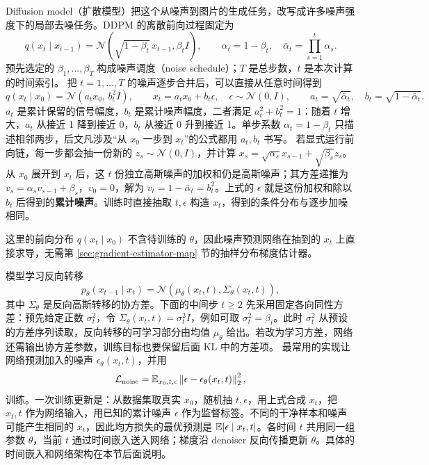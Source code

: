 Diffusion model（扩散模型）把这个从噪声到图片的生成任务，改写成许多噪声强度下的局部去噪任务。DDPM 的离散前向过程固定为~\cite{ho2020ddpm}
\begin{equation}
 q(x_t\mid x_{t-1})
 =\mathcal N\!\left(\sqrt{1-\beta_t}\,x_{t-1},\beta_t I\right),
\qquad \alpha_t=1-\beta_t,\quad
 \bar\alpha_t=\prod_{s=1}^{t}\alpha_s.
\end{equation}
预先选定的 \(\beta_1,\ldots,\beta_T\) 构成噪声调度（noise schedule）；\(T\) 是总步数，\(t\) 是本次计算的时间索引。
把 \(t=1,\ldots,T\) 的噪声逐步合并后，可以直接从任意时间得到
\begin{equation}
 q(x_t\mid x_0)
 =\mathcal N\!\left(a_tx_0,\,b_t^2I\right),
\qquad
 x_t=a_tx_0+b_t\epsilon,\quad
 \epsilon\sim\mathcal N(0,I),
\qquad
 a_t=\sqrt{\bar\alpha_t},\quad b_t=\sqrt{1-\bar\alpha_t}.
 \label{eq:ddpm-marginal}
\end{equation}
\(a_t\) 是累计保留的信号幅度，\(b_t\) 是累计噪声幅度，二者满足 \(a_t^2+b_t^2=1\)：随着 \(t\) 增大，\(a_t\) 从接近 1 降到接近 0，\(b_t\) 从接近 0 升到接近 1。单步系数 \(\alpha_t=1-\beta_t\) 只描述相邻两步，后文凡涉及“从 \(x_0\) 一步到 \(x_t\)”的公式都用 \(a_t,b_t\) 书写。
若显式运行前向链，每一步都会抽一份新的 \(z_s\sim\mathcal N(0,I)\)，并计算 \(x_s=\sqrt{\alpha_s}x_{s-1}+\sqrt{\beta_s}z_s\)。从 \(x_0\) 展开到 \(x_t\) 后，这 \(t\) 份独立高斯噪声的加权和仍是高斯噪声；其方差递推为 \(v_s=\alpha_sv_{s-1}+\beta_s\)，\(v_0=0\)，解为 \(v_t=1-\bar\alpha_t=b_t^2\)。上式的 \(\epsilon\) 就是这份加权和除以 \(b_t\) 后得到的\textbf{累计噪声}。训练时直接抽取 \(t,\epsilon\) 构造 \(x_t\)，得到的条件分布与逐步加噪相同。

这里的前向分布 \(q(x_t\mid x_0)\) 不含待训练的 \(\theta\)，因此噪声预测网络在抽到的 \(x_t\) 上直接求导，无需第 \ref{sec:gradient-estimator-map} 节的抽样分布梯度估计器。

模型学习反向转移
\begin{equation}
 p_\theta(x_{t-1}\mid x_t)
 =\mathcal N\!\left(\mu_\theta(x_t,t),
 \Sigma_\theta(x_t,t)\right),
\end{equation}
其中 \(\Sigma_\theta\) 是反向高斯转移的协方差。下面的中间步 \(t\geq2\) 先采用固定各向同性方差：预先给定正数 \(\sigma_t^2\)，令 \(\Sigma_\theta(x_t,t)=\sigma_t^2I\)，例如可取 \(\sigma_t^2=\beta_t\)。此时 \(\sigma_t^2\) 从预设的方差序列读取，反向转移的可学习部分由均值 \(\mu_\theta\) 给出。若改为学习方差，网络还需输出协方差参数，训练目标也要保留后面 KL 中的方差项。
最常用的实现让网络预测加入的噪声 \(\epsilon_\theta(x_t,t)\)，并用
\begin{equation}
 \mathcal L_{\mathrm{noise}}
 =\mathbb{E}_{x_0,t,\epsilon}
 \left\|\epsilon-\epsilon_\theta(x_t,t)\right\|_2^2,
\end{equation}
训练。一次训练更新是：从数据集取真实 \(x_0\)，随机抽 \(t,\epsilon\)，用上式合成 \(x_t\)，把 \(x_t,t\) 作为网络输入，用已知的累计噪声 \(\epsilon\) 作为监督标签。不同的干净样本和噪声可能产生相同的 \(x_t\)，因此均方损失的最优预测是 \(\mathbb{E}[\epsilon\mid x_t,t]\)。各时间 \(t\) 共用同一组参数 \(\theta\)，当前 \(t\) 通过时间嵌入送入网络；梯度沿 denoiser 反向传播更新 \(\theta\)。具体的时间嵌入和网络架构在本节后面说明。

